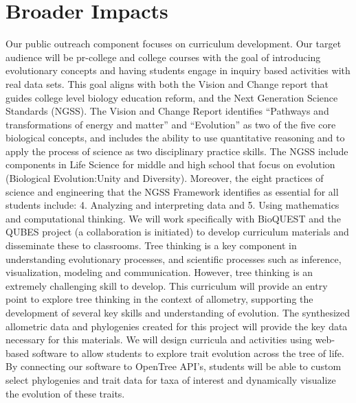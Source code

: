 \documentclass[10pt, a4paper]{article}
\begin{document}
\section*{Broader Impacts}
Our public outreach component focuses on curriculum development.  Our target audience will be pr-college and college courses with the goal of introducing evolutionary concepts and having students engage in inquiry based activities with real data sets. This goal aligns with both the Vision and Change report that guides college level biology education reform, and the Next Generation Science Standards (NGSS).  The Vision and Change Report identifies “Pathways and transformations of energy and matter” and “Evolution” as two of the five core biological concepts, and includes the ability to use quantitative reasoning and to apply the process of science as two disciplinary practice skills.  The NGSS include components in Life Science for middle and high school that focus on evolution (Biological Evolution:Unity and Diversity).  Moreover, the eight practices of science and engineering that the NGSS Framework identifies as essential for all students include: 4. Analyzing and interpreting data and 5. Using mathematics and computational thinking.  We will work specifically with BioQUEST and the QUBES project (a collaboration is initiated) to develop curriculum materials and disseminate these to classrooms.  Tree thinking is a key component in understanding evolutionary processes, and scientific processes such as inference, visualization, modeling and communication.  However, tree thinking is an extremely challenging skill to develop.  This curriculum will provide an entry point to explore tree thinking in the context of allometry, supporting the development of several key skills and understanding of evolution.  The synthesized allometric data and phylogenies created for this project will provide the key data necessary for this materials.  We will design curricula and activities using web-based software to allow students to explore trait evolution across the tree of life. By connecting our software to OpenTree API’s, students will be able to custom select phylogenies and trait data for taxa of interest and dynamically visualize the evolution of these traits. 
\clearpage

\renewcommand{\thepage}{}


\end{document}
